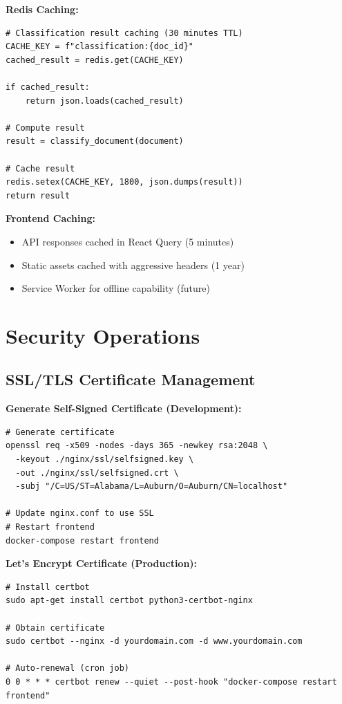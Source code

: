 \textbf{Redis Caching:}
\begin{lstlisting}[style=pythonstyle]
# Classification result caching (30 minutes TTL)
CACHE_KEY = f"classification:{doc_id}"
cached_result = redis.get(CACHE_KEY)

if cached_result:
    return json.loads(cached_result)

# Compute result
result = classify_document(document)

# Cache result
redis.setex(CACHE_KEY, 1800, json.dumps(result))
return result
\end{lstlisting}

\textbf{Frontend Caching:}
\begin{itemize}
    \item API responses cached in React Query (5 minutes)
    \item Static assets cached with aggressive headers (1 year)
    \item Service Worker for offline capability (future)
\end{itemize}

\section{Security Operations}

\subsection{SSL/TLS Certificate Management}

\textbf{Generate Self-Signed Certificate (Development):}
\begin{commandbox}
\begin{lstlisting}[style=bashstyle]
# Generate certificate
openssl req -x509 -nodes -days 365 -newkey rsa:2048 \
  -keyout ./nginx/ssl/selfsigned.key \
  -out ./nginx/ssl/selfsigned.crt \
  -subj "/C=US/ST=Alabama/L=Auburn/O=Auburn/CN=localhost"

# Update nginx.conf to use SSL
# Restart frontend
docker-compose restart frontend
\end{lstlisting}
\end{commandbox}

\textbf{Let's Encrypt Certificate (Production):}
\begin{commandbox}
\begin{lstlisting}[style=bashstyle]
# Install certbot
sudo apt-get install certbot python3-certbot-nginx

# Obtain certificate
sudo certbot --nginx -d yourdomain.com -d www.yourdomain.com

# Auto-renewal (cron job)
0 0 * * * certbot renew --quiet --post-hook "docker-compose restart frontend"
\end{lstlisting}
\end{commandbox}

